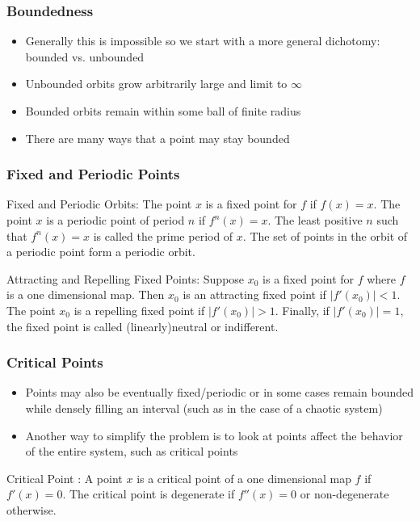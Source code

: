 \documentclass{beamer}
\newcommand{\<}{\left\langle}
\renewcommand{\>}{\right\rangle} %
\renewcommand{\*}{\cdot} %
\begin{document}
\begin{frame}
	\frametitle{Boundedness}
	\begin{itemize}
		\item Generally this is impossible so we start with a more general dichotomy: bounded vs. unbounded
		\item Unbounded orbits grow arbitrarily large and limit to $\infty$
		\item Bounded orbits remain within some ball of finite radius
		\item There are many ways that a point may stay bounded
	\end{itemize}
\end{frame}

\begin{frame}
	\frametitle{Fixed and Periodic Points}
	\begin{definition}{Fixed and Periodic Orbits\cite{Dev2}:}
		The point $x$ is a fixed point for $f$ if $f (x) = x$. The point $x$ is a periodic point of period $n$ if $f^n (x) = x$. The least positive $n$ such that $f^n (x) = x$ is called the prime period of $x$. The set of points in the orbit of a periodic point form a periodic orbit. 
	\end{definition}

	\begin{definition}{Attracting and Repelling Fixed Points\cite{Dev1}:}
		Suppose $x_0$ is a fixed point for $f$ where $f$ is a one dimensional map. Then $x_0$ is an attracting fixed point if $|f' (x_0) | < 1$. The point $x_0$ is a repelling fixed point if $|f' (x_0)| > 1$. Finally, if $|f' (x_0)| = 1$, the fixed point is called (linearly)neutral or indifferent.
	\end{definition}
\end{frame}

\begin{frame}
	\frametitle{Critical Points}
	\begin{itemize}
		\item Points may also be eventually fixed/periodic or in some cases remain bounded while densely filling an interval (such as in the case of a chaotic system)
		\item Another way to simplify the problem is to look at points affect the behavior of the entire system, such as critical points
	\end{itemize}
	\begin{definition}{Critical Point \cite{Dev2}:}
		A point $x$ is a critical point of a one dimensional map $f$ if $f' (x) =0$. The critical point is degenerate if $f'' (x)  = 0$ or non-degenerate otherwise.
	\end{definition}

\end{frame}
\end{document}
